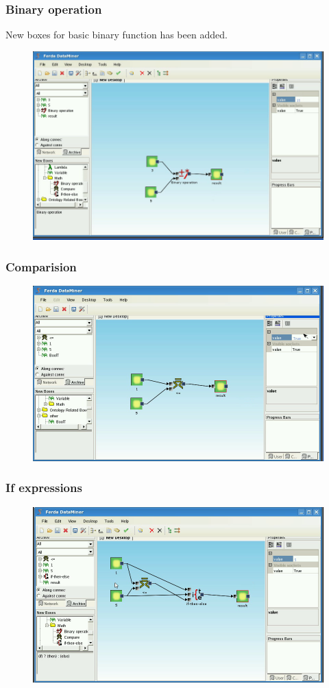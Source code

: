 \documentclass{article}
\begin{document}
\subsubsection{Binary operation}
New boxes for basic binary function has been added. 
\begin{figure}
	\includegraphics[width=12cm]{binaryOperation2.png}
	\caption{}
\end{figure}

\subsubsection{Comparision}
\begin{figure}
\includegraphics[width=12cm]{compare2.png}
	\caption{}
\end{figure}

\subsubsection{If expressions}
\begin{figure}
\includegraphics[width=12cm]{ifthenelse2.png}
	\caption{}
\end{figure}
\end{document}
